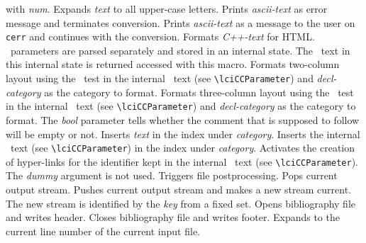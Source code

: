 \documentclass[11pt]{article}
\begin{document}
\begin{description}
    with {\em num}.
    Expands {\em text\/} to all upper-case letters.
    Prints {\em ascii-text\/} as error message and terminates conversion.
    Prints {\em ascii-text\/} as a message to the user on {\tt cerr}
    and continues with the conversion.
    Formats {\em C++-text} for HTML.
    \CC\ parameters are parsed separately and stored in an internal state.
    The \CC\ text in this internal state is returned accessed with this macro.
    Formats two-column layout using the \CC\ test in the internal \CC\ text
    (see \verb+\lciCCParameter+) and {\em decl-category} as the category 
    to format.
    Formats three-column layout using the \CC\ test in the internal \CC\ text
    (see \verb+\lciCCParameter+) and {\em decl-category} as the category 
    to format. The {\em bool\/} parameter tells whether the comment that 
    is supposed to follow will be empty or not.
    Inserts {\em text\/} in the index under {\em category}.
    Inserts the internal \CC\ text (see \verb+\lciCCParameter+) in the 
    index under {\em category}.
    Activates the creation of hyper-links for the identifier kept in the 
    internal \CC\ text (see \verb+\lciCCParameter+). The {\em dummy\/}
    argument is not used.
    Triggers file postprocessing.
    Pops current output stream.
    Pushes current output stream and makes a new stream current.
    The new stream is identified by the {\em key\/} from a fixed set.
    Opens bibliography file and writes header.
    Closes bibliography file and writes footer.
    Expands to the current line number of the current input file.
\end{description}





\newpage

%


\small
\printindex
\end{document}
